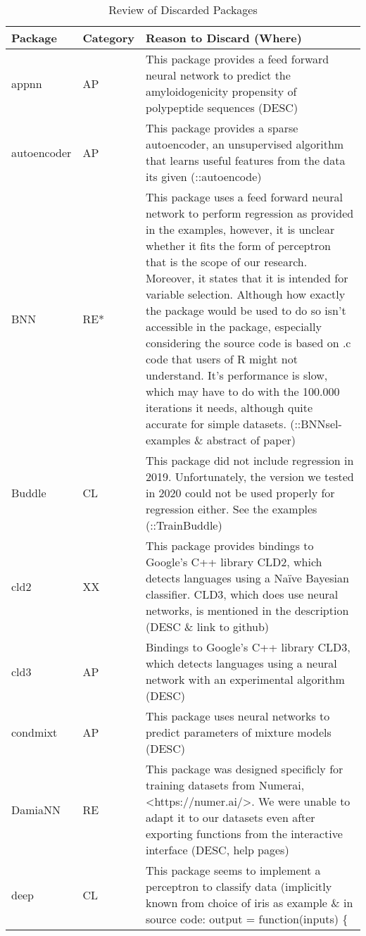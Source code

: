 \begin{Schunk}
\begin{longtable}[t]{ll>{\raggedright\arraybackslash}p{10cm}}
\caption{\label{tab:unnamed-chunk-3}Review of Discarded Packages}\\
\toprule
Package & Category & Reason to Discard (Where)\\
\midrule
appnn & AP & This package provides a feed forward neural network to predict the amyloidogenicity propensity of polypeptide sequences (DESC)\\
autoencoder & AP & This package provides a sparse autoencoder, an unsupervised algorithm that learns useful features from the data its given (::autoencode)\\
BNN & RE* & This package uses a feed forward neural network to perform regression as provided in the examples, however, it is unclear whether it fits the form of perceptron that is the scope of our research. Moreover, it states that it is intended for variable selection. Although how exactly the package would be used to do so isn't accessible in the package, especially considering the source code is based on .c code that users of R might not understand. It's performance is slow, which may have to do with the 100.000 iterations it needs, although quite accurate for simple datasets. (::BNNsel-examples \& abstract of paper)\\
Buddle & CL & This package did not include regression in 2019. Unfortunately, the version we tested in 2020 could not be used properly for regression either. See the examples (::TrainBuddle)\\
cld2 & XX & This package provides bindings to Google's C++ library CLD2, which detects languages using a Naïve Bayesian classifier. CLD3, which does use neural networks, is mentioned in the description (DESC \& link to github)\\
\addlinespace
cld3 & AP & Bindings to Google's C++ library CLD3, which detects languages using a neural network with an experimental algorithm (DESC)\\
condmixt & AP & This package uses neural networks to predict parameters of mixture models (DESC)\\
DamiaNN & RE & This package was designed specificly for training datasets from Numerai, <https://numer.ai/>. We were unable to adapt it to our datasets even after exporting functions from the interactive interface (DESC, help pages)\\
deep & CL & This package seems to implement a perceptron to classify data (implicitly known from choice of iris as example \& in source code: output = function(inputs) \{

\end{longtable}
\end{Schunk}
